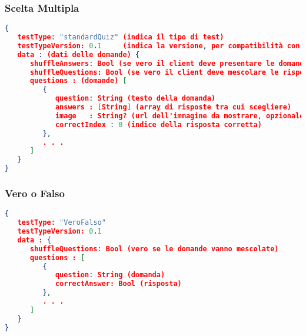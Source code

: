 \subsubsection{Scelta Multipla}
\label{subs:Scelta Multipla}
\begin{lstlisting}[language=json,firstnumber=1]
{
   testType: "standardQuiz" (indica il tipo di test)
   testTypeVersion: 0.1     (indica la versione, per compatibilità con futuri aggiornamenti)
   data : (dati delle domande) {
      shuffleAnswers: Bool (se vero il client deve presentare le domande in ordine casuale)
      shuffleQuestions: Bool (se vero il client deve mescolare le risposte per ogni domanda)
      questions : (domande) [
         {
            question: String (testo della domanda)
            answers : [String] (array di risposte tra cui scegliere)
            image   : String? (url dell'immagine da mostrare, opzionale)
            correctIndex : 0 (indice della risposta corretta)
         },
         . . .
      ]
   }
}
\end{lstlisting}

\subsubsection{Vero o Falso}
\label{subs:Vero o Falso}
\begin{lstlisting}[language=json,firstnumber=1]
{
   testType: "VeroFalso"
   testTypeVersion: 0.1
   data : {
      shuffleQuestions: Bool (vero se le domande vanno mescolate)
      questions : [
         {
            question: String (domanda)
            correctAnswer: Bool (risposta)
         },
         . . .
      ]
   }
}

\end{lstlisting}
